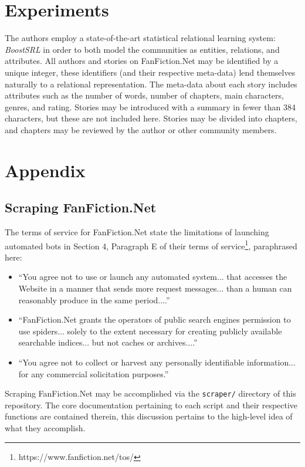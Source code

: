 \documentclass[letterpaper]{article}
\begin{document}
\section{Experiments}

The authors employ a state-of-the-art statistical relational learning system: \textit{BoostSRL} in order to both model the communities as entities, relations, and attributes. All authors and stories on FanFiction.Net may be identified by a unique integer, these identifiers (and their respective meta-data) lend themselves naturally to a relational representation. The meta-data about each story includes attributes such as the number of words, number of chapters, main characters, genres, and rating. Stories may be introduced with a summary in fewer than 384 characters, but these are not included here. Stories may be divided into chapters, and chapters may be reviewed by the author or other community members.

\section{Appendix}

\subsection{Scraping FanFiction.Net}

The terms of service for FanFiction.Net state the limitations of launching automated bots in Section 4, Paragraph E of their terms of service\footnote{https://www.fanfiction.net/tos/}, paraphrased here:

\begin{itemize}
    \item ``You agree not to use or launch any automated system... that accesses the Website in a manner that sends more request messages... than a human can reasonably produce in the same period....''
    \item ``FanFiction.Net grants the operators of public search engines permission to use spiders... solely to the extent necessary for creating publicly available searchable indices... but not caches or archives....''
    \item ``You agree not to collect or harvest any personally identifiable information... for any commercial solicitation purposes.''
\end{itemize}

Scraping FanFiction.Net may be accomplished via the \texttt{scraper/} directory of this repository. The core documentation pertaining to each script and their respective functions are contained therein, this discussion pertains to the high-level idea of what they accomplish.
\end{document}
